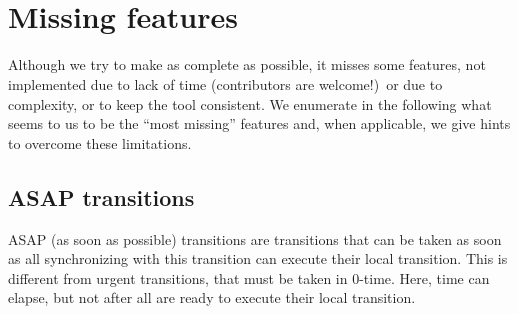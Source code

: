 \begin{multicols}{2}
	 \\
	 \\
	 \\
	 \\
	 \\
	 \\
	 \\
	 \\
	 \\
	 \\
	 \\
	 \\
	 \\
	 \\
	 \\
	 \\
	 \\
	 \\
	 \\
\end{multicols}


\chapter{Missing features}

Although we try to make \imitator{} as complete as possible, it misses some features, not implemented due to lack of time (contributors are welcome!)\ or due to complexity, or to keep the tool consistent.
We enumerate in the following what seems to us to be the ``most missing'' features and, when applicable, we give hints to overcome these limitations.



\section{ASAP transitions}

ASAP (as soon as possible) transitions are transitions that can be taken as soon as all \IPTA{} synchronizing with this transition can execute their local transition.
This is different from urgent transitions, that must be taken in 0-time.
Here, time can elapse, but not after all \IPTA{} are ready to execute their local transition.

